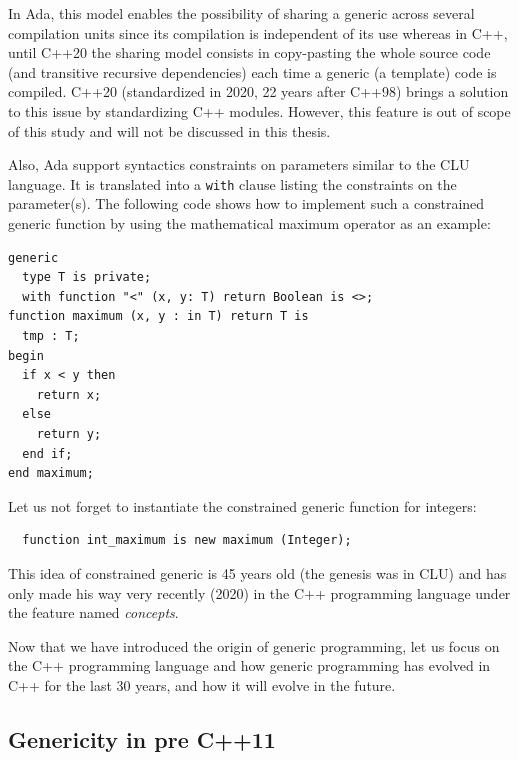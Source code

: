 In Ada, this model enables the possibility of sharing a generic across several compilation units since its compilation is
independent of its use whereas in C++, until C++20 the sharing model consists in copy-pasting the whole source code
(and transitive recursive dependencies) each time a generic (a template) code is compiled. C++20 (standardized in 2020,
22 years after C++98) brings a solution to this issue by standardizing C++ modules. However, this feature is out of scope
of this study and will not be discussed in this thesis.

Also, Ada support syntactics constraints on parameters similar to the CLU language. It is translated into a \texttt{with}
clause listing the constraints on the parameter(s). The following code shows how to implement such a constrained generic
function by using the mathematical maximum operator as an example:

\begin{verbatim}
generic
  type T is private;
  with function "<" (x, y: T) return Boolean is <>;
function maximum (x, y : in T) return T is
  tmp : T;
begin
  if x < y then
    return x;
  else
    return y;
  end if;
end maximum;
\end{verbatim}

Let us not forget to instantiate the constrained generic function for integers:

\begin{verbatim}
  function int_maximum is new maximum (Integer);
\end{verbatim}

This idea of constrained generic is 45 years old (the genesis was in CLU) and has only made his way very recently (2020)
in the C++ programming language under the feature named \emph{concepts}.

Now that we have introduced the origin of generic programming, let us focus on the C++ programming language and how
generic programming has evolved in C++ for the last 30 years, and how it will evolve in the future.

\subsection{Genericity in pre C++11}
\label{sec:precpp11}

